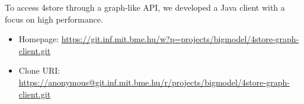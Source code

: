 To access 4store through a graph-like API, we developed a Java client with a focus on high performance.

\begin{itemize}
  \item Homepage: \url{https://git.inf.mit.bme.hu/w?p=projects/bigmodel/4store-graph-client.git}
  \item Clone URI: \url{https://anonymous@git.inf.mit.bme.hu/r/projects/bigmodel/4store-graph-client.git}
\end{itemize}

